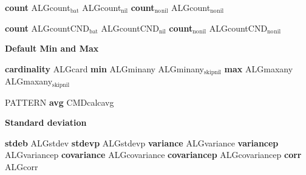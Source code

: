 \documentclass[11pt]{article}
\begin{document}
\textbf{count}
ALGcount\(_{\text{bat}}\)
ALGcount\(_{\text{nil}}\)
\textbf{count\(_{\text{no}}\)\(_{\text{nil}}\)}
ALGcount\(_{\text{no}}\)\(_{\text{nil}}\)

\textbf{count}
ALGcountCND\(_{\text{bat}}\)
ALGcountCND\(_{\text{nil}}\)
\textbf{count\(_{\text{no}}\)\(_{\text{nil}}\)}
ALGcountCND\(_{\text{no}}\)\(_{\text{nil}}\)

\textbf{\textbf{Default Min and Max}}

\textbf{cardinality}
ALGcard
\textbf{min}
ALGminany
ALGminany\(_{\text{skipnil}}\)
\textbf{max}
ALGmaxany
ALGmaxany\(_{\text{skipnil}}\)

PATTERN
\textbf{avg}
CMDcalcavg

\textbf{\textbf{Standard deviation}}

\textbf{stdeb}
ALGstdev
\textbf{stdevp}
ALGstdevp
\textbf{variance}
ALGvariance
\textbf{variancep}
ALGvariancep
\textbf{covariance}
ALGcovariance
\textbf{covariancep}
ALGcovariancep
\textbf{corr}
ALGcorr
\end{document}
